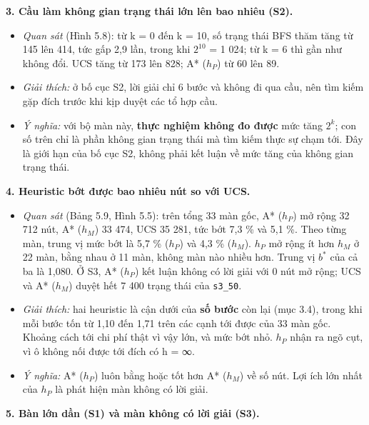 \textbf{3. Cầu làm không gian trạng thái lớn lên bao nhiêu (S2).}

\begin{itemize}
\tightlist
\item
  \emph{Quan sát} (Hình 5.8): từ k = 0 đến k = 10, số trạng thái BFS thăm tăng từ 145 lên 414, tức gấp 2,9 lần, trong khi \(2^{10}\) = 1 024; từ k = 6 thì gần như không đổi. UCS tăng từ 173 lên 828; A* (\(h_P\)) từ 60 lên 89.
\item
  \emph{Giải thích:} ở bố cục S2, lời giải chỉ 6 bước và không đi qua cầu, nên tìm kiếm gặp đích trước khi kịp duyệt các tổ hợp cầu.
\item
  \emph{Ý nghĩa:} với bộ màn này, \textbf{thực nghiệm không đo được} mức tăng \(2^k\); con số trên chỉ là phần không gian trạng thái mà tìm kiếm thực sự chạm tới. Đây là giới hạn của bố cục S2, không phải kết luận về mức tăng của không gian trạng thái.
\end{itemize}

\textbf{4. Heuristic bớt được bao nhiêu nút so với UCS.}

\begin{itemize}
\tightlist
\item
  \emph{Quan sát} (Bảng 5.9, Hình 5.5): trên tổng 33 màn gốc, A* (\(h_P\)) mở rộng 32 712 nút, A* (\(h_M\)) 33 474, UCS 35 281, tức bớt 7,3 \% và 5,1 \%. Theo từng màn, trung vị mức bớt là 5,7 \% (\(h_P\)) và 4,3 \% (\(h_M\)). \(h_P\) mở rộng ít hơn \(h_M\) ở 22 màn, bằng nhau ở 11 màn, không màn nào nhiều hơn. Trung vị \(b^*\) của cả ba là 1,080. Ở S3, A* (\(h_P\)) kết luận không có lời giải với 0 nút mở rộng; UCS và A* (\(h_M\)) duyệt hết 7 400 trạng thái của \texttt{s3\_\allowbreak{}50}.
\item
  \emph{Giải thích:} hai heuristic là cận dưới của \textbf{số bước} còn lại (mục 3.4), trong khi mỗi bước tốn từ 1,10 đến 1,71 trên các cạnh tới được của 33 màn gốc. Khoảng cách tới chi phí thật vì vậy lớn, và mức bớt nhỏ. \(h_P\) nhận ra ngõ cụt, vì ô không nối được tới đích có h = ∞.
\item
  \emph{Ý nghĩa:} A* (\(h_P\)) luôn bằng hoặc tốt hơn A* (\(h_M\)) về số nút. Lợi ích lớn nhất của \(h_P\) là phát hiện màn không có lời giải.
\end{itemize}

\textbf{5. Bàn lớn dần (S1) và màn không có lời giải (S3).}

